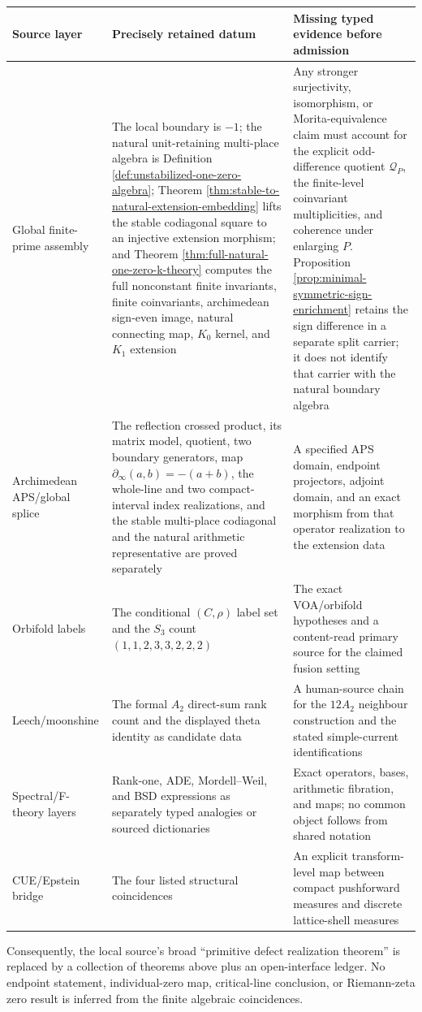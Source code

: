 \begin{center}
\begin{tabular}{p{}p{}p{}}
\toprule
Source layer & Precisely retained datum & Missing typed evidence before admission\\
\midrule
 Global finite-prime assembly & The local boundary is $-1$; the natural
 unit-retaining multi-place algebra is Definition
 \ref{def:unstabilized-one-zero-algebra}; Theorem
 \ref{thm:stable-to-natural-extension-embedding} lifts the stable codiagonal
 square to an injective extension morphism; and Theorem
 \ref{thm:full-natural-one-zero-k-theory} computes the full nonconstant
 finite invariants, finite coinvariants, archimedean sign-even image, natural
 connecting map, $K_0$ kernel, and $K_1$ extension & Any stronger
 surjectivity, isomorphism, or Morita-equivalence claim must account for the
 explicit odd-difference quotient $\mathcal Q_P$, the finite-level
 coinvariant multiplicities, and coherence under enlarging $P$.
 Proposition \ref{prop:minimal-symmetric-sign-enrichment} retains the sign
 difference in a separate split carrier; it does not identify that carrier
 with the natural boundary algebra\\
Archimedean APS/global splice & The reflection crossed product, its matrix
 model, quotient, two boundary generators, map $\partial_\infty(a,b)=-(a+b)$,
 the whole-line and two compact-interval index realizations, and the stable
 multi-place codiagonal and the natural arithmetic representative are proved
 separately & A specified APS domain, endpoint projectors, adjoint domain,
 and an exact morphism from that operator realization to the extension data\\
Orbifold labels & The conditional $(C,\rho)$ label set and the $S_3$ count $(1,1,2,3,3,2,2,2)$ & The exact VOA/orbifold hypotheses and a content-read primary source for the claimed fusion setting\\
Leech/moonshine & The formal $A_2$ direct-sum rank count and the displayed theta identity as candidate data & A human-source chain for the $12A_2$ neighbour construction and the stated simple-current identifications\\
Spectral/F-theory layers & Rank-one, ADE, Mordell--Weil, and BSD expressions as separately typed analogies or sourced dictionaries & Exact operators, bases, arithmetic fibration, and maps; no common object follows from shared notation\\
CUE/Epstein bridge & The four listed structural coincidences & An explicit transform-level map between compact pushforward measures and discrete lattice-shell measures\\
\bottomrule
\end{tabular}
\end{center}

Consequently, the local source's broad ``primitive defect realization theorem''
is replaced by a collection of theorems above plus an open-interface ledger.
No endpoint statement, individual-zero map, critical-line conclusion, or
Riemann-zeta zero result is inferred from the finite algebraic coincidences.
